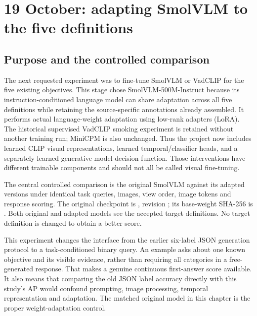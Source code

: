 \chapter{19 October: adapting SmolVLM to the five definitions}
\label{ch:smol}

\section{Purpose and the controlled comparison}
The next requested experiment was to fine-tune SmolVLM or VadCLIP for the five existing objectives. This stage chose SmolVLM-500M-Instruct because its instruction-conditioned language model can share adaptation across all five definitions while retaining the source-specific annotations already assembled. It performs actual language-weight adaptation using low-rank adapters (LoRA). The historical supervised VadCLIP smoking experiment is retained without another training run; MiniCPM is also unchanged. Thus the project now includes learned CLIP visual representations, learned temporal/classifier heads, and a separately learned generative-model decision function. Those interventions have different trainable components and should not all be called visual fine-tuning.

The central controlled comparison is the original SmolVLM against its adapted versions under identical task queries, images, view order, image tokens and response scoring. The original checkpoint is , revision ; its base-weight SHA-256 is . Both original and adapted models see the accepted target definitions. No target definition is changed to obtain a better score.

This experiment changes the interface from the earlier six-label JSON generation protocol to a task-conditioned binary query. An example asks about one known objective and its visible evidence, rather than requiring all categories in a free-generated response. That makes a genuine continuous first-answer score available. It also means that comparing the old JSON label accuracy directly with this study's AP would confound prompting, image processing, temporal representation and adaptation. The matched original model in this chapter is the proper weight-adaptation control.


